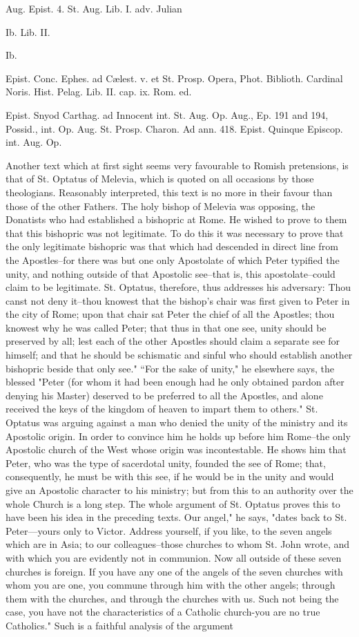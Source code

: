 Aug. Epist. 4. St. Aug. Lib. I. adv. Julian

Ib. Lib. II.

Ib.

Epist. Conc. Ephes. ad Cælest. v. et St. Prosp. Opera, Phot. Biblioth. Cardinal Noris. Hist. Pelag. Lib. II. cap. ix. Rom. ed.

Epist. Snyod Carthag. ad Innocent int. St. Aug. Op. Aug., Ep. 191 and 194, Possid., int. Op. Aug. St. Prosp. Charon. Ad ann. 418. Epist. Quinque Episcop. int. Aug. Op.

Another text which at first sight seems very favourable to Romish pretensions, is that of St. Optatus of Melevia, which is quoted on all occasions by those theologians. Reasonably interpreted, this text is no more in their favour than those of the other Fathers. The holy bishop of Melevia was opposing, the Donatists who had established a bishopric at Rome. He wished to prove to them that this bishopric was not legitimate. To do this it was necessary to prove that the only legitimate bishopric was that which had descended in direct line from the Apostles--for there was but one only Apostolate of which Peter typified the unity, and nothing outside of that Apostolic see--that is, this apostolate--could claim to be legitimate. St. Optatus, therefore, thus addresses his adversary: Thou canst not deny it--thou knowest that the bishop's chair was first given to Peter in the city of Rome; upon that chair sat Peter the chief of all the Apostles; thou knowest why he was called Peter; that thus in that one see, unity should be preserved by all; lest each of the other Apostles should claim a separate see for himself; and that he should be schismatic and sinful who should establish another bishopric beside that only see." “For the sake of unity," he elsewhere says, the blessed "Peter (for whom it had been enough had he only obtained pardon after denying his Master) deserved to be preferred to all the Apostles, and alone received the keys of the kingdom of heaven to impart them to others." St. Optatus was arguing against a man who denied the unity of the ministry and its Apostolic origin. In order to convince him he holds up before him Rome--the only Apostolic church of the West whose origin was incontestable. He shows him that Peter, who was the type of sacerdotal unity, founded the see of Rome; that, consequently, he must be with this see, if he would be in the unity and would give an Apostolic character to his ministry; but from this to an authority over the whole Church is a long step. The whole argument of St. Optatus proves this to have been his idea in the preceding texts. Our angel," he says, "dates back to St. Peter—yours only to Victor. Address yourself, if you like, to the seven angels which are in Asia; to our colleagues--those churches to whom St. John wrote, and with which you are evidently not in communion. Now all outside of these seven churches is foreign. If you have any one of the angels of the seven churches with whom you are one, you commune through him with the other angels; through them with the churches, and through the churches with us. Such not being the case, you have not the characteristics of a Catholic church-you are no true Catholics." Such is a faithful analysis of the argument 